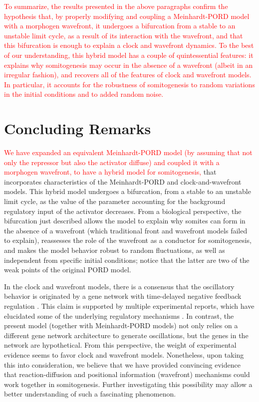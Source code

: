 \documentclass[%
 preprint,
 aip, 
 amsmath,amssymb,
]{revtex4-2}
\begin{document}
\textcolor{red}{To summarize, the results presented in the above paragraphs confirm the hypothesis that, by properly modifying and coupling a Meinhardt-PORD model with a morphogen wavefront, it undergoes a bifurcation from a stable to an unstable limit cycle, as a result of its interaction with the wavefront, and that this bifurcation is enough to explain a clock and wavefront dynamics. To the best of our understanding, this hybrid model has a couple of quintessential features: it explains why somitogenesis may occur in the absence of a wavefront (albeit in an irregular fashion), and recovers all of the features of clock and wavefront models. In particular, it accounts for the robustness of somitogenesis to random variations in the initial conditions and to added random noise.}
	
	
	\section{Concluding Remarks}
	\label{conclu}
	
\textcolor{red}{We have expanded an equivalent Meinhardt-PORD model (by assuming that not only the repressor but also the activator diffuse) and coupled it with a morphogen wavefront, to have a hybrid model for somitogenesis,} that incorporates characteristics of the Meinhardt-PORD and clock-and-wavefront models.  This hybrid model undergoes a bifurcation, from a stable to an unstable limit cycle, as the value of the parameter accounting for the background regulatory input of the activator decreases. From a biological perspective, the bifurcation just described allows the model to explain why somites can form in the absence of a wavefront (which traditional front and wavefront models failed to explain), reassesses the role of the wavefront as a conductor for somitogenesis, and makes the model behavior robust to random fluctuations, as well as independent from specific initial conditions; notice that the latter are two of the weak points of the original PORD model. 
	
	In the clock and wavefront models, there is a consensus that the oscillatory behavior is originated by a gene network with time-delayed negative feedback regulation \cite{Monk2003, Lewis2003}. This claim is supported by multiple experimental reports, which have elucidated some of the underlying regulatory mechanisms \cite{Schroter2012}. In contrast, the present model (together with Meinhardt-PORD models) not only relies on a different gene network architecture to generate oscillations, but the genes in the network are hypothetical. From this perspective, the weight of experimental evidence seems to favor clock and wavefront models. Nonetheless, upon taking this into consideration, we believe that we have provided convincing evidence that reaction-diffusion and positional information (wavefront) mechanisms could work together in somitogenesis. Further investigating this possibility may allow a better understanding of such a fascinating phenomenon.
	
\end{document}
